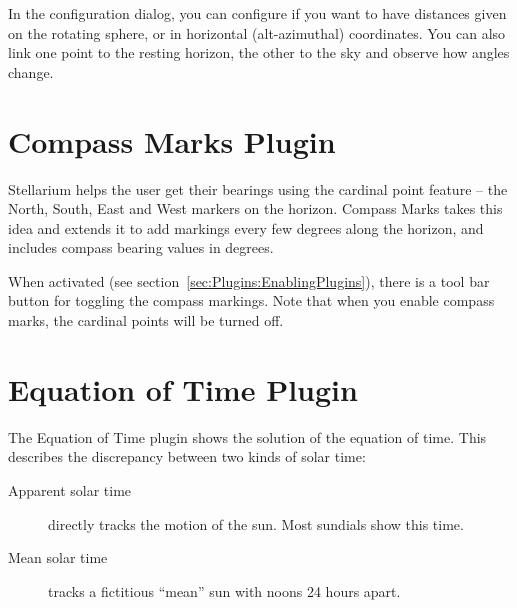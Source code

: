 \noindent In the configuration dialog, you can configure if you want to have
distances given on the rotating sphere, or in horizontal
(alt-azimuthal) coordinates. You can also link one point to the
resting horizon, the other to the sky and observe how angles change.

\newpage

\section{Compass Marks Plugin}
\label{sec:plugins:CompassMarks}


Stellarium helps the user get their bearings using the cardinal point
feature -- the North, South, East and West markers on the horizon.
Compass Marks takes this idea and extends it to add markings every few
degrees along the horizon, and includes compass bearing values in
degrees.

When activated (see section~\ref{sec:Plugins:EnablingPlugins}), there
is a tool bar button  for toggling the
compass markings.  Note that when you enable compass marks, the
cardinal points will be turned off.



\newpage
\section{Equation of Time Plugin}
\label{sec:plugins:EquationOfTime}


\noindent The Equation of Time plugin shows the solution of the equation of time. %
This describes the discrepancy between two kinds of
solar time:
\begin{description}
\item[Apparent solar time] directly tracks the motion of the sun. Most sundials show this time.
\item[Mean solar time] tracks a fictitious ``mean'' sun with noons 24 hours apart. 
\end{description}

